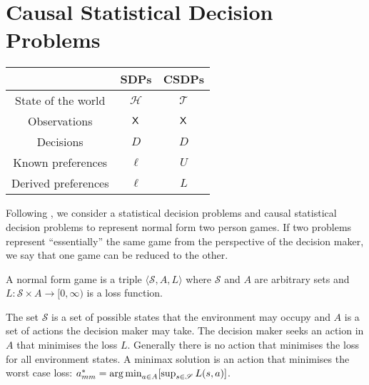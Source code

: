 \section{Causal Statistical Decision Problems}

\begin{center}
\begin{tabular}{ |c|c|c| } 
 \hline
  & SDPs & CSDPs \\ 
 \hline
 State of the world & $\mathscr{H}$ & $\mathscr{T}$ \\ 
 Observations & $\mathsf{X}$ & $\mathsf{X}$ \\ 
 Decisions & $D$ & $D$ \\
 Known preferences & $\ell$ & $U$ \\
 Derived preferences & $\ell$ & $L$\\
 \hline
\end{tabular}
\end{center}



Following \citep{toutenburg_ferguson_1970}, we consider a statistical decision problems and causal statistical decision problems to represent normal form two person games. If two problems represent ``essentially'' the same game from the perspective of the decision maker, we say that one game can be reduced to the other.


\begin{definition}
A normal form game is a triple $\langle \mathscr{S}, A, L\rangle$ where $\mathscr{S}$ and $A$ are arbitrary sets and $L:\mathscr{S}\times A\to [0,\infty)$ is a loss function.
\end{definition}
The set $\mathscr{S}$ is a set of possible states that the environment may occupy and $A$ is a set of actions the decision maker may take. The decision maker seeks an action in $A$ that minimises the loss $L$. Generally there is no action that minimises the loss for all environment states. A minimax solution is an action that minimises the worst case loss: $a^*_{mm} = \operatorname*{arg\,min}_{a\in A} [\sup_{s\in \mathscr{S}} L(s,a)]$.

